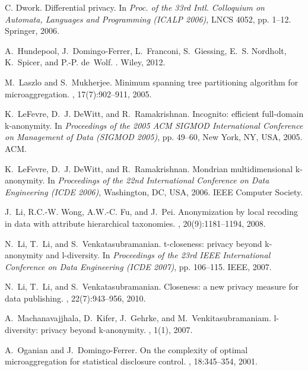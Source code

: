 \documentclass[10pt,journal,compsoc]{IEEEtran}
\theoremstyle{definition}
\theoremstyle{plain}
\begin{document}
\begin{thebibliography}{10}
	C. Dwork.
	\newblock Differential privacy.
	\newblock In {\em Proc. of the 33rd Intl. Colloquium on Automata,
	Languages and Programming (ICALP 2006)}, LNCS 4052, pp. 1--12. Springer,
 2006.
	
	A.~Hundepool, J.~Domingo-Ferrer, L.~Franconi, S.~Giessing, E.~S. Nordholt,
	K.~Spicer, and P.-P. de~Wolf.
	.
	\newblock Wiley, 2012.
	
	M.~Laszlo and S.~Mukherjee.
	\newblock Minimum spanning tree partitioning algorithm for microaggregation.
	,
	17(7):902--911, 2005.
	
	K.~LeFevre, D.~J. DeWitt, and R.~Ramakrishnan.
	\newblock Incognito: efficient full-domain k-anonymity.
	\newblock In {\em Proceedings of the 2005 ACM SIGMOD International Conference
		on Management of Data (SIGMOD 2005)}, pp. 49--60, New York, NY, USA, 2005.
	ACM.
	
	K.~LeFevre, D.~J. DeWitt, and R.~Ramakrishnan.
	\newblock Mondrian multidimensional k-anonymity.
	\newblock In {\em Proceedings of the 22nd International Conference on Data
		Engineering (ICDE 2006)}, Washington, DC, USA, 2006. IEEE Computer Society.
	
	J.~Li, R.C.-W. Wong, A.W.-C. Fu, and J.~Pei.
	\newblock Anonymization by local recoding in data with attribute hierarchical
	taxonomies.
	,
	20(9):1181--1194, 2008.
	
	N.~Li, T.~Li, and S.~Venkatasubramanian.
	\newblock t-closeness: privacy beyond k-anonymity and l-diversity.
	\newblock In 
	{\em Proceedings of the 23rd IEEE International Conference on Data
		Engineering (ICDE 2007)}, pp. 106--115. IEEE, 2007.
	
	N.~Li, T.~Li, and S.~Venkatasubramanian.
	\newblock Closeness: a new privacy measure for data publishing.
	,
	22(7):943--956, 2010.
	
	A.~Machanavajjhala, D.~Kifer, J.~Gehrke, and M.~Venkitasubramaniam.
	\newblock l-diversity: privacy beyond k-anonymity.
	, 1(1), 2007.
	
	A.~Oganian and J.~Domingo-Ferrer.
	\newblock On the complexity of optimal microaggregation for statistical
	disclosure control.
	, 18:345--354, 2001.
	

\end{thebibliography}
\end{document}
